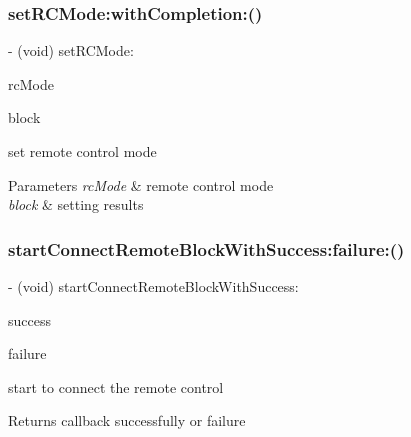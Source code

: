 \subsubsection{\texorpdfstring{set\+R\+C\+Mode\+:with\+Completion\+:()}{setRCMode:withCompletion:()}}
{\footnotesize\ttfamily -\/ (void) set\+R\+C\+Mode\+: \begin{DoxyParamCaption}\item[{(P\+V\+R\+C\+Mode)}]{rc\+Mode }\item[{withCompletion:(P\+V\+Completion\+Block)}]{block }\end{DoxyParamCaption}}

set remote control mode


\begin{DoxyParams}{Parameters}
{\em rc\+Mode} & remote control mode \\
\hline
{\em block} & setting results \\
\hline
\end{DoxyParams}
\mbox{\label{interface_p_v_remote_controller_a92c7f4e6977d8bca2566f8fd285fd6d2}} 
\subsubsection{\texorpdfstring{start\+Connect\+Remote\+Block\+With\+Success\+:failure\+:()}{startConnectRemoteBlockWithSuccess:failure:()}}
{\footnotesize\ttfamily -\/ (void) start\+Connect\+Remote\+Block\+With\+Success\+: \begin{DoxyParamCaption}\item[{(P\+V\+Completion\+Block)}]{success }\item[{failure:(P\+V\+Completion\+Block)}]{failure }\end{DoxyParamCaption}}

start to connect the remote control

\begin{DoxyReturn}{Returns}
callback successfully or failure 
\end{DoxyReturn}
\mbox{\label{interface_p_v_remote_controller_a8850de9fd27227933d2b2b27810667a2}} 
